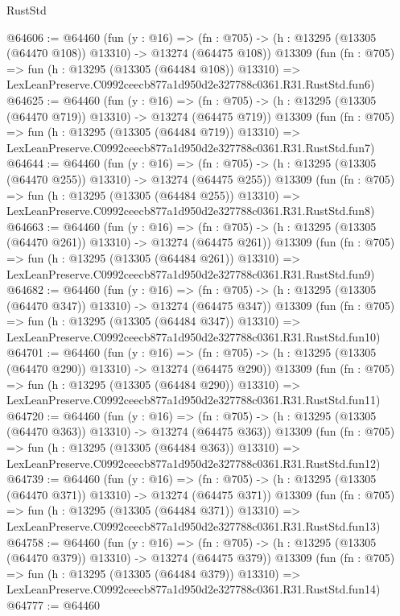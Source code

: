 \begin{lexlean}{RustStd}
\begin{coremodule}
@64606 := @64460
    (fun (y : @16) =>
    (fn : @705) -> (h : @13295 (@13305 (@64470 @108)) @13310) -> @13274 (@64475 @108))
    @13309
    (fun (fn : @705) =>
    fun (h : @13295 (@13305 (@64484 @108)) @13310) =>
    LexLeanPreserve.C0992ceecb877a1d950d2e327788c0361.R31.RustStd.fun6)
@64625 := @64460
    (fun (y : @16) =>
    (fn : @705) -> (h : @13295 (@13305 (@64470 @719)) @13310) -> @13274 (@64475 @719))
    @13309
    (fun (fn : @705) =>
    fun (h : @13295 (@13305 (@64484 @719)) @13310) =>
    LexLeanPreserve.C0992ceecb877a1d950d2e327788c0361.R31.RustStd.fun7)
@64644 := @64460
    (fun (y : @16) =>
    (fn : @705) -> (h : @13295 (@13305 (@64470 @255)) @13310) -> @13274 (@64475 @255))
    @13309
    (fun (fn : @705) =>
    fun (h : @13295 (@13305 (@64484 @255)) @13310) =>
    LexLeanPreserve.C0992ceecb877a1d950d2e327788c0361.R31.RustStd.fun8)
@64663 := @64460
    (fun (y : @16) =>
    (fn : @705) -> (h : @13295 (@13305 (@64470 @261)) @13310) -> @13274 (@64475 @261))
    @13309
    (fun (fn : @705) =>
    fun (h : @13295 (@13305 (@64484 @261)) @13310) =>
    LexLeanPreserve.C0992ceecb877a1d950d2e327788c0361.R31.RustStd.fun9)
@64682 := @64460
    (fun (y : @16) =>
    (fn : @705) -> (h : @13295 (@13305 (@64470 @347)) @13310) -> @13274 (@64475 @347))
    @13309
    (fun (fn : @705) =>
    fun (h : @13295 (@13305 (@64484 @347)) @13310) =>
    LexLeanPreserve.C0992ceecb877a1d950d2e327788c0361.R31.RustStd.fun10)
@64701 := @64460
    (fun (y : @16) =>
    (fn : @705) -> (h : @13295 (@13305 (@64470 @290)) @13310) -> @13274 (@64475 @290))
    @13309
    (fun (fn : @705) =>
    fun (h : @13295 (@13305 (@64484 @290)) @13310) =>
    LexLeanPreserve.C0992ceecb877a1d950d2e327788c0361.R31.RustStd.fun11)
@64720 := @64460
    (fun (y : @16) =>
    (fn : @705) -> (h : @13295 (@13305 (@64470 @363)) @13310) -> @13274 (@64475 @363))
    @13309
    (fun (fn : @705) =>
    fun (h : @13295 (@13305 (@64484 @363)) @13310) =>
    LexLeanPreserve.C0992ceecb877a1d950d2e327788c0361.R31.RustStd.fun12)
@64739 := @64460
    (fun (y : @16) =>
    (fn : @705) -> (h : @13295 (@13305 (@64470 @371)) @13310) -> @13274 (@64475 @371))
    @13309
    (fun (fn : @705) =>
    fun (h : @13295 (@13305 (@64484 @371)) @13310) =>
    LexLeanPreserve.C0992ceecb877a1d950d2e327788c0361.R31.RustStd.fun13)
@64758 := @64460
    (fun (y : @16) =>
    (fn : @705) -> (h : @13295 (@13305 (@64470 @379)) @13310) -> @13274 (@64475 @379))
    @13309
    (fun (fn : @705) =>
    fun (h : @13295 (@13305 (@64484 @379)) @13310) =>
    LexLeanPreserve.C0992ceecb877a1d950d2e327788c0361.R31.RustStd.fun14)
@64777 := @64460

\end{coremodule}
\end{lexlean}
